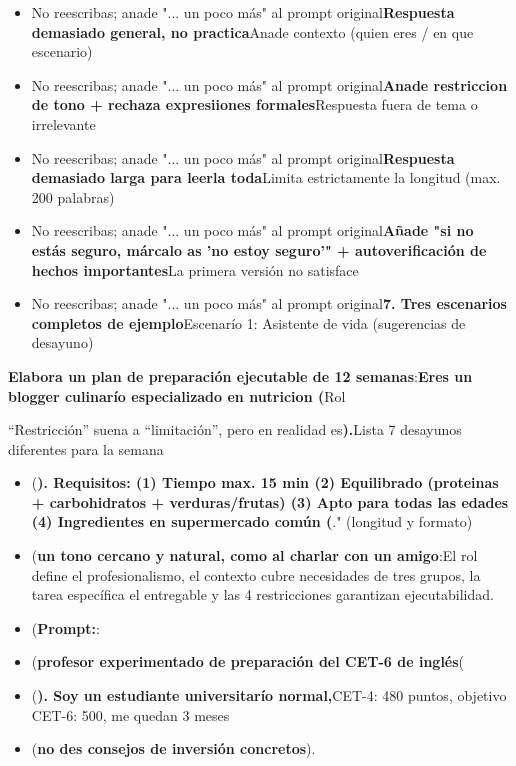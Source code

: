 \begin{itemize}
  \item No reescribas; anade "... un poco más" al prompt original\textbf{Respuesta demasiado general, no practica}Anade contexto (quien eres / en que escenario)
  \item No reescribas; anade "... un poco más" al prompt original\textbf{Anade restriccion de tono + rechaza expresiiones formales}Respuesta fuera de tema o irrelevante
  \item No reescribas; anade "... un poco más" al prompt original\textbf{Respuesta demasiado larga para leerla toda}Limita estrictamente la longitud (max. 200 palabras)
  \item No reescribas; anade "... un poco más" al prompt original\textbf{Añade "si no estás seguro, márcalo as 'no estoy seguro'" + autoverificación de hechos importantes}La primera versión no satisface
  \item No reescribas; anade "... un poco más" al prompt original\textbf{7. Tres escenarios completos de ejemplo}Escenarío 1: Asistente de vida (sugerencias de desayuno)
\end{itemize}

\textbf{Elabora un plan de preparación ejecutable de 12 semanas}:\textbf{Eres un blogger culinarío especializado en nutricion (}Rol


“Restricción” suena a “limitación”, pero en realidad es\textbf{).}Lista 7 desayunos diferentes para la semana

\booksubsection{(}

\begin{itemize}
  \item (\textbf{). Requisitos: (1) Tiempo max. 15 min (2) Equilibrado (proteinas + carbohidratos + verduras/frutas) (3) Apto para todas las edades (4) Ingredientes en supermercado común (}." (longitud y formato)
  \item (\textbf{un tono cercano y natural, como al charlar con un amigo}:El rol define el profesionalismo, el contexto cubre necesidades de tres grupos, la tarea específica el entregable y las 4 restricciones garantizan ejecutabilidad.
  \item (\textbf{Prompt:}:
  \item (\textbf{profesor experimentado de preparación del CET-6 de inglés}(
  \item (\textbf{). Soy un estudiante universitarío normal,}CET-4: 480 puntos, objetivo CET-6: 500, me quedan 3 meses
  \item (\textbf{no des consejos de inversión concretos}).
\end{itemize}

